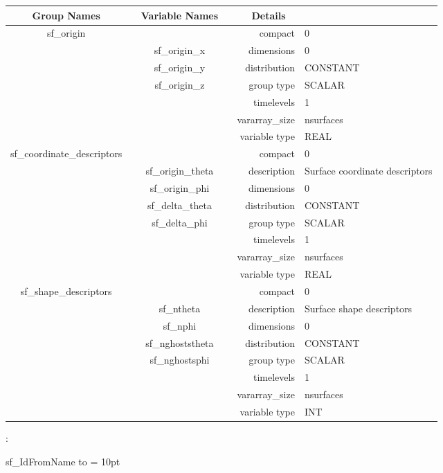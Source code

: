 \begin{tabular*}{150mm}{|c|c@{\extracolsep{\fill}}|rl|} \hline 
~ {\bf Group Names} ~ & ~ {\bf Variable Names} ~  &{\bf Details} ~ & ~ \\ 
\hline 
sf\_origin &  & compact & 0 \\ 
 & sf\_origin\_x & dimensions & 0 \\ 
 & sf\_origin\_y & distribution & CONSTANT \\ 
 & sf\_origin\_z & group type & SCALAR \\ 
 &  & timelevels & 1 \\ 
 &  & vararray\_size & nsurfaces \\ 
 &  & variable type & REAL \\ 
\hline 
sf\_coordinate\_descriptors &  & compact & 0 \\ 
 & sf\_origin\_theta & description & Surface coordinate descriptors \\ 
 & sf\_origin\_phi & dimensions & 0 \\ 
 & sf\_delta\_theta & distribution & CONSTANT \\ 
 & sf\_delta\_phi & group type & SCALAR \\ 
 &  & timelevels & 1 \\ 
 &  & vararray\_size & nsurfaces \\ 
 &  & variable type & REAL \\ 
\hline 
sf\_shape\_descriptors &  & compact & 0 \\ 
 & sf\_ntheta & description & Surface shape descriptors \\ 
 & sf\_nphi & dimensions & 0 \\ 
 & sf\_nghoststheta & distribution & CONSTANT \\ 
 & sf\_nghostsphi & group type & SCALAR \\ 
 &  & timelevels & 1 \\ 
 &  & vararray\_size & nsurfaces \\ 
 &  & variable type & INT \\ 
\hline 
\end{tabular*} 



\vspace{5mm}

: 



sf\_IdFromName to 
\vspace{2mm}\parskip = 10pt 
